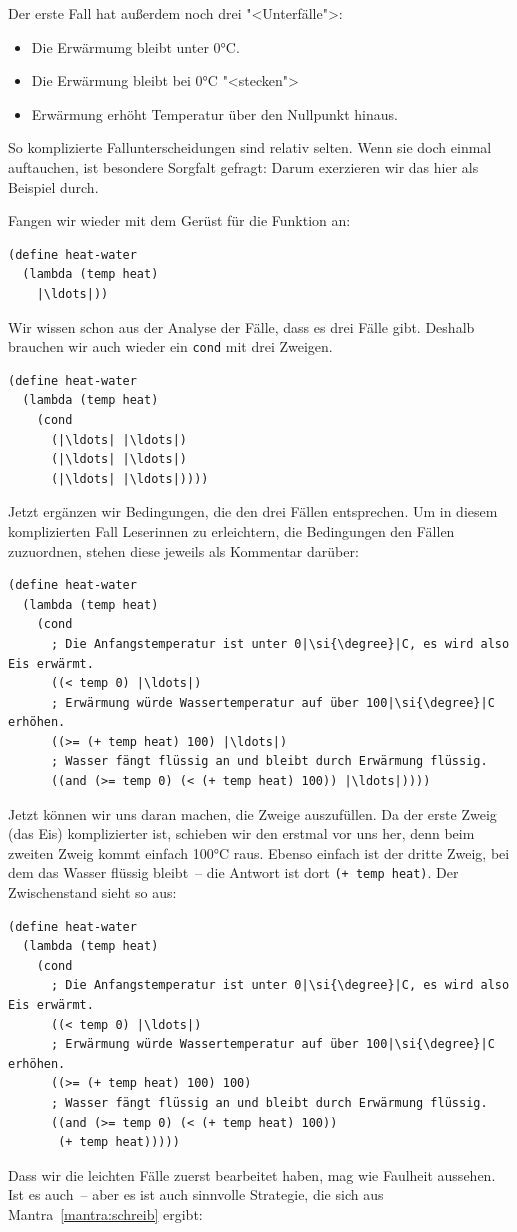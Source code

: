 %
Der erste Fall hat außerdem noch drei "<Unterfälle">:
%
\begin{itemize}
\item Die Erwärmumg bleibt unter 0\si{\degree}C.
\item Die Erwärmung bleibt bei  0\si{\degree}C "<stecken">
\item Erwärmung erhöht Temperatur über den Nullpunkt hinaus.
\end{itemize}
%
So komplizierte Fallunterscheidungen sind relativ selten. Wenn sie
doch einmal auftauchen, ist besondere Sorgfalt gefragt: Darum
exerzieren wir das hier als Beispiel durch.

Fangen wir wieder mit dem Gerüst für die Funktion an:
%
\begin{lstlisting}
(define heat-water
  (lambda (temp heat)
    |\ldots|))
\end{lstlisting}
%
Wir wissen schon aus der Analyse der Fälle, dass es drei Fälle gibt.
Deshalb brauchen wir auch wieder ein \lstinline{cond} mit drei Zweigen.
%
\begin{lstlisting}
(define heat-water
  (lambda (temp heat)
    (cond
      (|\ldots| |\ldots|)
      (|\ldots| |\ldots|)
      (|\ldots| |\ldots|))))
\end{lstlisting}
%
Jetzt ergänzen wir Bedingungen, die den drei Fällen entsprechen.  Um
in diesem komplizierten Fall Leserinnen zu erleichtern, die
Bedingungen den Fällen zuzuordnen, stehen diese jeweils als Kommentar darüber:
%
\begin{lstlisting}
(define heat-water
  (lambda (temp heat)
    (cond
      ; Die Anfangstemperatur ist unter 0|\si{\degree}|C, es wird also Eis erwärmt.
      ((< temp 0) |\ldots|)
      ; Erwärmung würde Wassertemperatur auf über 100|\si{\degree}|C erhöhen.
      ((>= (+ temp heat) 100) |\ldots|)
      ; Wasser fängt flüssig an und bleibt durch Erwärmung flüssig.
      ((and (>= temp 0) (< (+ temp heat) 100)) |\ldots|))))
\end{lstlisting}
%
Jetzt können wir uns daran machen, die Zweige auszufüllen.  Da der
erste Zweig (das Eis) komplizierter ist, schieben wir den erstmal vor
uns her, denn beim zweiten Zweig kommt einfach 100\si{\degree}C raus.  Ebenso
einfach ist der dritte Zweig, bei dem das Wasser flüssig bleibt~-- die
Antwort ist dort \lstinline{(+ temp heat)}.  Der Zwischenstand sieht so
aus:
%
\begin{lstlisting}
(define heat-water
  (lambda (temp heat)
    (cond
      ; Die Anfangstemperatur ist unter 0|\si{\degree}|C, es wird also Eis erwärmt.
      ((< temp 0) |\ldots|)
      ; Erwärmung würde Wassertemperatur auf über 100|\si{\degree}|C erhöhen.
      ((>= (+ temp heat) 100) 100)
      ; Wasser fängt flüssig an und bleibt durch Erwärmung flüssig.
      ((and (>= temp 0) (< (+ temp heat) 100))
       (+ temp heat)))))
\end{lstlisting}
%
Dass wir die leichten Fälle zuerst bearbeitet haben, mag wie Faulheit
aussehen.  Ist es auch~-- aber es ist auch sinnvolle Strategie, die
sich aus Mantra~\ref{mantra:schreib} ergibt:

